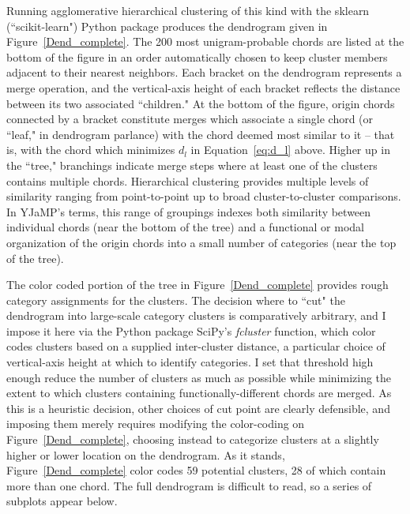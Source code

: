 Running agglomerative hierarchical clustering of this kind with the sklearn (``scikit-learn") Python package produces the dendrogram given in Figure~\ref{Dend_complete}.  The 200 most unigram-probable chords are listed at the bottom of the figure in an order automatically chosen to keep cluster members adjacent to their nearest neighbors.  Each bracket on the dendrogram represents a merge operation, and the vertical-axis height of each bracket reflects the distance between its two associated ``children."  At the bottom of the figure, origin chords connected by a bracket constitute merges which associate a single chord (or ``leaf," in dendrogram parlance) with the chord deemed most similar to it -- that is, with the chord which minimizes $d_l$ in Equation~\ref{eq:d_l} above.  Higher up in the ``tree," branchings indicate merge steps where at least one of the clusters contains multiple chords.  Hierarchical clustering provides multiple levels of similarity ranging from point-to-point up to broad cluster-to-cluster comparisons.  In YJaMP's terms, this range of groupings indexes both similarity between individual chords (near the bottom of the tree) and a functional or modal organization of the origin chords into a small number of categories (near the top of the tree).

The color coded portion of the tree in Figure~\ref{Dend_complete} provides rough category assignments for the clusters.  The decision where to ``cut" the dendrogram into large-scale category clusters is comparatively arbitrary, and I impose it here via the Python package SciPy's \emph{fcluster} function, which color codes clusters based on a supplied inter-cluster distance, a particular choice of vertical-axis height at which to identify categories.  I set that threshold high enough reduce the number of clusters as much as possible while minimizing the extent to which clusters containing functionally-different chords are merged.  As this is a heuristic decision, other choices of cut point are clearly defensible, and imposing them merely requires modifying the color-coding on Figure~\ref{Dend_complete}, choosing instead to categorize clusters at a slightly higher or lower location on the dendrogram.  As it stands, Figure~\ref{Dend_complete} color codes 59 potential clusters, 28 of which contain more than one chord.  The full dendrogram is difficult to read, so a series of subplots appear below.

